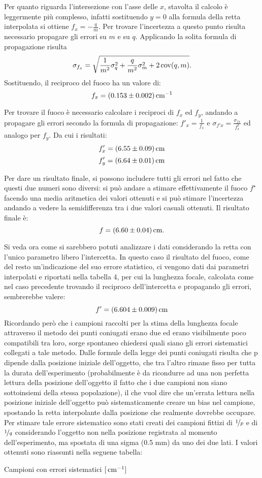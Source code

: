 Per quanto riguarda l'intersezione con l'asse delle $x$, stavolta il calcolo è leggermente più complesso, infatti sostituendo $y = 0$
 alla formula della retta interpolata si ottiene $f_x = -\frac{q}{m}$.  Per trovare l'incertezza a questo punto risulta necessario
 propagare gli errori su $m$ e su $q$. Applicando la solita formula di propagazione risulta
\[\sigma_{f_x} = \sqrt {\frac{1} {m^2} \sigma_q^2 + \frac{q}{m^2} \sigma_m^2 + 2 \operatorname{cov} (q,m) }.\] Sostituendo,
 il reciproco del fuoco ha un valore di:
\[f_x = (0.153 \pm 0.002) \,\mathrm{cm}^{-1}\]

Per trovare il fuoco è necessario calcolare i reciproci di $f_x$ ed $f_y$, andando a propagare gli errori secondo la formula di 
propagazione: $f'_x = \frac{1}{f_x}$ e $\sigma_{f'x} = \frac{\sigma_{fx}}{f_{x}^2}$ ed analogo per $f_y$. Da cui i risultati:
\[f'_x = (6.55 \pm 0.09) \,\mathrm{cm} \]
\[f'_y = (6.64 \pm 0.01) \,\mathrm{cm} \]

Per dare un risultato finale, si possono includere tutti gli errori nel fatto che questi due numeri sono diversi: si può andare a
 stimare effettivamente il fuoco $f^{\star}$ facendo una media aritmetica dei valori ottenuti e si può stimare l'incertezza
 andando a vedere la
 semidifferenza tra i due valori casuali ottenuti. Il risultato finale è:
\[f = (6.60 \pm 0.04) \,\mathrm{cm} .\]

Si veda ora come si sarebbero potuti analizzare i dati considerando la retta con l'unico parametro libero l'intercetta. In questo
 caso il risultato del fuoco, come del resto un'indicazione del suo errore statistico, ci vengono dati dai parametri interpolati e
 riportati nella tabella 4, per cui la lunghezza focale, calcolata come nel caso precedente trovando il reciproco
 dell'intercetta e propagando gli errori, sembrerebbe valere:
\[f' = (6.604 \pm 0.009) \,\mathrm{cm} \]
Ricordando però che i campioni raccolti per la stima della lunghezza focale attraverso il metodo dei punti coniugati erano due ed
 erano visibilmente poco compatibili tra loro, sorge spontaneo chiedersi quali siano gli errori sistematici collegati a tale metodo.
 Dalle formule della legge dei punti coniugati risulta che p dipende dalla posizione iniziale dell'oggetto, che tra
 l'altro rimane fisso per tutta la durata dell'esperimento (probabilmente è da ricondurre ad una non perfetta lettura della posizione
 dell'oggetto il fatto che i due campioni non siano sottoinsiemi della stessa popolazione), il che vuol dire che un'errata lettura
 nella posizione iniziale dell'oggetto può sistematicamente creare un bias nel campione, spostando la retta interpolante dalla
 posizione che realmente dovrebbe occupare. Per stimare tale errore sistematico sono stati creati dei campioni fittizi di $\nicefrac{1}{p}$ e
 di $\nicefrac{1}{q}$ considerando l'oggetto non nella posizione registrata al momento dell'esperimento, ma spostata di una sigma (0.5 mm) da
 uno dei due lati. I valori ottenuti sono riassunti nella seguene tabella:
\begin{tabella}
	\centering
	
	\caption{Campioni con errori sistematici $[\,\mathrm{cm}^{-1}]$}
	\label{tab:02tab5}
\end{tabella}

